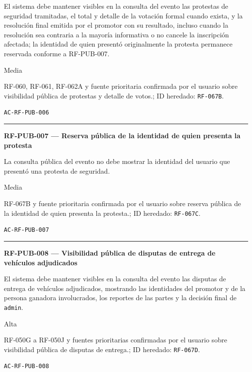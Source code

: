 \documentclass[10pt,letterpaper]{article}
\begin{document}
\begin{description}[style=nextline,leftmargin=3.15cm,labelwidth=2.8cm,font=\normalfont\bfseries]
\item[Obligación] El sistema debe mantener visibles en la consulta del evento las protestas de seguridad tramitadas, el total y detalle de la votación formal cuando exista, y la resolución final emitida por el promotor con su resultado, incluso cuando la resolución sea contraria a la mayoría informativa o no cancele la inscripción afectada; la identidad de quien presentó originalmente la protesta permanece reservada conforme a RF-PUB-007.
\item[Prioridad] Media
\item[Procedencia] RF-060, RF-061, RF-062A y fuente prioritaria confirmada por el usuario sobre visibilidad pública de protestas y detalle de votos.; ID heredado: \texttt{RF-067B}.
\item[Verificación] \texttt{AC-RF-PUB-006}
\end{description}
\vspace{0.25em}\hrule\vspace{0.65em}
\noindent\textbf{RF-PUB-007 --- Reserva pública de la identidad de quien presenta la protesta}\par
\begin{description}[style=nextline,leftmargin=3.15cm,labelwidth=2.8cm,font=\normalfont\bfseries]
\item[Obligación] La consulta pública del evento no debe mostrar la identidad del usuario que presentó una protesta de seguridad.
\item[Prioridad] Media
\item[Procedencia] RF-067B y fuente prioritaria confirmada por el usuario sobre reserva pública de la identidad de quien presenta la protesta.; ID heredado: \texttt{RF-067C}.
\item[Verificación] \texttt{AC-RF-PUB-007}
\end{description}
\vspace{0.25em}\hrule\vspace{0.65em}
\noindent\textbf{RF-PUB-008 --- Visibilidad pública de disputas de entrega de vehículos adjudicados}\par
\begin{description}[style=nextline,leftmargin=3.15cm,labelwidth=2.8cm,font=\normalfont\bfseries]
\item[Obligación] El sistema debe mantener visibles en la consulta del evento las disputas de entrega de vehículos adjudicados, mostrando las identidades del promotor y de la persona ganadora involucrados, los reportes de las partes y la decisión final de \texttt{admin}.
\item[Prioridad] Alta
\item[Procedencia] RF-050G a RF-050J y fuentes prioritarias confirmadas por el usuario sobre visibilidad pública de disputas de entrega.; ID heredado: \texttt{RF-067D}.
\item[Verificación] \texttt{AC-RF-PUB-008}
\end{description}
\end{document}
